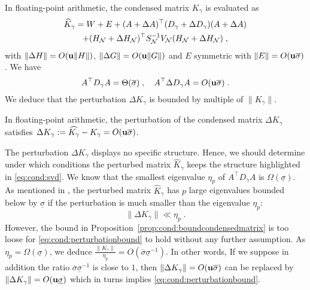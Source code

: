 In floating-point arithmetic, the condensed matrix $K_\gamma$ is evaluated as
\begin{multline*}
  \widehat{K}_\gamma = W + E + (A + \Delta A)^\top (D_\gamma + \Delta D_\gamma) (A + \Delta A) \\
  + (H_{\mathcal{N}} + \Delta H_{\mathcal{N}})^\top S_{\mathcal{N}}^{-1} V_{\mathcal{N}} (H_{\mathcal{N}} + \Delta H_{\mathcal{N}}) \; ,
\end{multline*}
with $\| \Delta H \| = O(\mathbf{u} \| H\|)$, $\| \Delta G \| = O(\mathbf{u} \| G\|)$
and $E$ symmetric with $\|E \| = O(\mathbf{u} \overline{\sigma})$.
We have
\begin{equation}
A^\top D_\gamma A = \Theta(\overline{\sigma}) \; , \quad
A^\top \Delta D_\gamma A = O(\mathbf{u} \overline{\sigma}) \; .
\end{equation}
We deduce that the perturbation $\Delta K_\gamma$ is bounded
by multiple of $\| K_\gamma \|$.
\begin{proposition}
  \label{prop:cond:boundcondensedmatrix}
  In floating-point arithmetic, the perturbation
  of the condensed matrix $\Delta K_\gamma$ satisfies
  $\Delta K_\gamma := \widehat{K_\gamma} - K_\gamma  = O(\mathbf{u} \overline{\sigma})$.
\end{proposition}
The perturbation $\Delta K_\gamma$ displays no specific structure.
Hence, we should determine under which
conditions the perturbed matrix $\widehat{K}_\gamma$
keeps the structure highlighted in \eqref{eq:cond:svd}.
We know that the smallest eigenvalue $\eta_p$ of $A^\top D_\gamma A$
is $\Omega(\underline{\sigma})$. As mentioned in
\cite[Section 3.4.2]{wright1998ill}, the perturbed matrix
$\widehat{K}_\gamma$ has $p$ large eigenvalues
bounded below by $\underline{\sigma}$ if the perturbation
is much smaller than the eigenvalue $\eta_p$:
\begin{equation}
  \label{eq:cond:perturbationbound}
  \| \Delta K_\gamma \| \ll \eta_p  \; .
\end{equation}
However, the bound in Proposition~\ref{prop:cond:boundcondensedmatrix} is too loose
for \eqref{eq:cond:perturbationbound} to hold without any further assumption.
As $\eta_p = \Omega(\underline{\sigma})$, we deduce $\frac{\|K_\gamma \|}{\eta_p}
= O(\overline{\sigma}\underline{\sigma}^{-1})$.
In other words,
If we suppose in addition the ratio $\overline{\sigma}\underline{\sigma}^{-1}$ is close to $1$,
then $\|\Delta K_\gamma\| = O(\mathbf{u} \overline{\sigma})$ can be replaced by
$\| \Delta K_\gamma\|= O(\mathbf{u} \underline{\sigma})$ which in turns implies \eqref{eq:cond:perturbationbound}.

